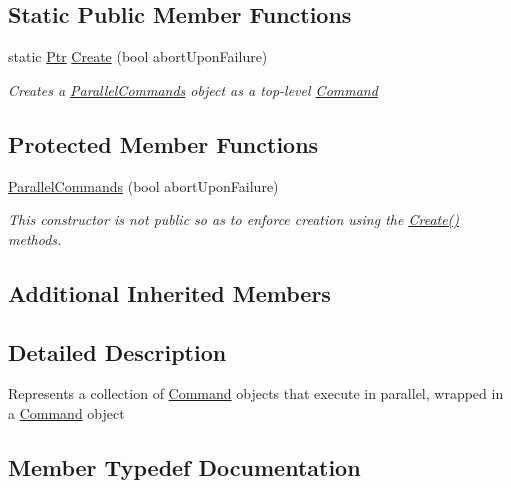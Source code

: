 \subsection*{Static Public Member Functions}
\begin{DoxyCompactItemize}
\item 
static \mbox{\hyperlink{class_command_lib_1_1_command_a3b3e4f00144373299df5c6bb1acc319d}{Ptr}} \mbox{\hyperlink{class_command_lib_1_1_parallel_commands_ab75ed6ec91fa1c4652a796a6c0f6868e}{Create}} (bool abort\+Upon\+Failure)
\begin{DoxyCompactList}\small\item\em Creates a \mbox{\hyperlink{class_command_lib_1_1_parallel_commands}{Parallel\+Commands}} object as a top-\/level \mbox{\hyperlink{class_command_lib_1_1_command}{Command}} \end{DoxyCompactList}\end{DoxyCompactItemize}
\subsection*{Protected Member Functions}
\begin{DoxyCompactItemize}
\item 
\mbox{\hyperlink{class_command_lib_1_1_parallel_commands_a795b2df9523b7a154261a52971b29bef}{Parallel\+Commands}} (bool abort\+Upon\+Failure)
\begin{DoxyCompactList}\small\item\em This constructor is not public so as to enforce creation using the \mbox{\hyperlink{class_command_lib_1_1_parallel_commands_ab75ed6ec91fa1c4652a796a6c0f6868e}{Create()}} methods. \end{DoxyCompactList}\end{DoxyCompactItemize}
\subsection*{Additional Inherited Members}


\subsection{Detailed Description}
Represents a collection of \mbox{\hyperlink{class_command_lib_1_1_command}{Command}} objects that execute in parallel, wrapped in a \mbox{\hyperlink{class_command_lib_1_1_command}{Command}} object



\subsection{Member Typedef Documentation}
\mbox{\label{class_command_lib_1_1_parallel_commands_a8ad2164f54391fa1cdffb5d44298580e}} 

